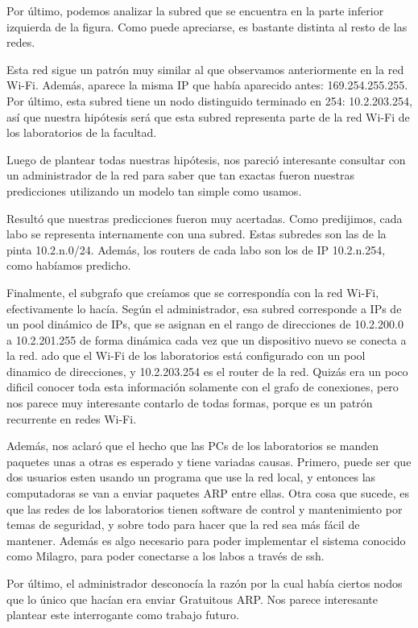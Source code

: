 Por último, podemos analizar la subred que se encuentra en la parte inferior izquierda de la figura. Como puede apreciarse, es bastante distinta al resto de las redes. 

Esta red sigue un patrón muy similar al que observamos anteriormente en la red Wi-Fi. Además, aparece la misma IP que había aparecido antes: 169.254.255.255. Por último, esta subred tiene un nodo distinguido terminado en 254: 10.2.203.254, así que nuestra hipótesis será que esta subred representa parte de la red Wi-Fi de los laboratorios de la facultad.


Luego de plantear todas nuestras hipótesis, nos pareció interesante consultar con un administrador de la red para saber que tan exactas fueron nuestras predicciones utilizando un modelo tan simple como usamos.

Resultó que nuestras predicciones fueron muy acertadas. Como predijimos, cada labo se representa internamente con una subred. Estas subredes son las de la pinta 10.2.n.0/24. Además, los routers de cada labo son los de IP 10.2.n.254, como habíamos predicho.

Finalmente, el subgrafo que creíamos que se correspondía con la red Wi-Fi, efectivamente lo hacía. Según el administrador, esa subred corresponde a IPs de un pool dinámico de IPs, que se asignan en el rango de direcciones de 10.2.200.0 a 10.2.201.255 de forma dinámica cada vez que un dispositivo nuevo se conecta a la red. ado que el Wi-Fi de los laboratorios está configurado con un pool dinamico de direcciones, y 10.2.203.254 es el router de la red. Quizás era un poco dificil
conocer toda esta información solamente con el grafo de conexiones, pero nos parece muy interesante contarlo de todas formas, porque es un patrón recurrente en redes Wi-Fi.

Además, nos aclaró que el hecho que las PCs de los laboratorios se manden paquetes unas a otras es esperado y tiene variadas causas. Primero, puede ser que dos usuarios esten usando un programa que use la red local, y entonces las computadoras se van a enviar paquetes ARP entre ellas. 
Otra cosa que sucede, es que las redes de los laboratorios tienen software de control y mantenimiento por temas de seguridad, y sobre todo para hacer que la red sea más fácil de mantener. Además es algo necesario para poder implementar el sistema conocido como Milagro, para poder conectarse a los labos a trav\'es de ssh.

Por último, el administrador desconocía la razón por la cual había ciertos nodos que lo único que hacían era enviar Gratuitous ARP. Nos parece interesante plantear este interrogante como trabajo futuro.
